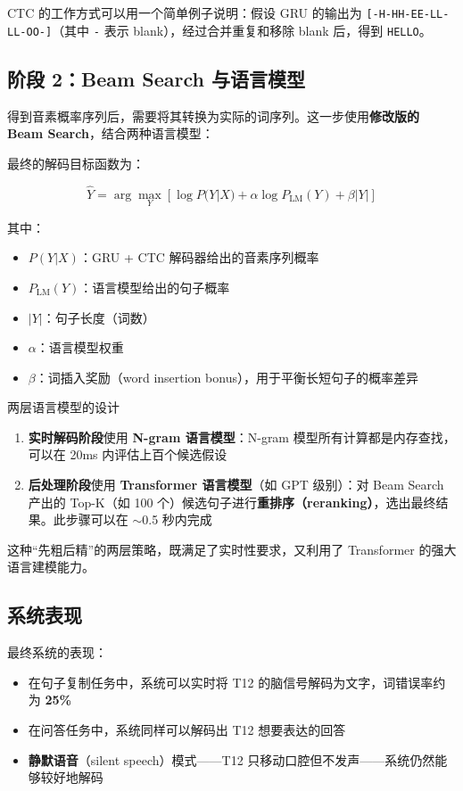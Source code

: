 \documentclass[a4paper]{article}
\begin{document}
CTC 的工作方式可以用一个简单例子说明：假设 GRU 的输出为 \texttt{[-H-HH-EE-LL-LL-OO-]}（其中 \texttt{-} 表示 blank），经过合并重复和移除 blank 后，得到 \texttt{HELLO}。

\subsection{阶段 2：Beam Search 与语言模型}

得到音素概率序列后，需要将其转换为实际的词序列。这一步使用\textbf{修改版的 Beam Search}，结合两种语言模型：

最终的解码目标函数为：

$$\hat{Y} = \arg\max_Y \left[ \log P(Y|X) + \alpha \log P_{\text{LM}}(Y) + \beta |Y| \right]$$

其中：
\begin{itemize}
    \item $P(Y|X)$：GRU + CTC 解码器给出的音素序列概率
    \item $P_{\text{LM}}(Y)$：语言模型给出的句子概率
    \item $|Y|$：句子长度（词数）
    \item $\alpha$：语言模型权重
    \item $\beta$：词插入奖励（word insertion bonus），用于平衡长短句子的概率差异
\end{itemize}

\begin{importantbox}{两层语言模型的设计}
\begin{enumerate}
    \item \textbf{实时解码阶段}使用 \textbf{N-gram 语言模型}：N-gram 模型所有计算都是内存查找，可以在 20ms 内评估上百个候选假设
    \item \textbf{后处理阶段}使用 \textbf{Transformer 语言模型}（如 GPT 级别）：对 Beam Search 产出的 Top-K（如 100 个）候选句子进行\textbf{重排序（reranking）}，选出最终结果。此步骤可以在 $\sim$0.5 秒内完成
\end{enumerate}

这种``先粗后精''的两层策略，既满足了实时性要求，又利用了 Transformer 的强大语言建模能力。
\end{importantbox}

\subsection{系统表现}

最终系统的表现：

\begin{itemize}
    \item 在句子复制任务中，系统可以实时将 T12 的脑信号解码为文字，词错误率约为 \textbf{25\%}
    \item 在问答任务中，系统同样可以解码出 T12 想要表达的回答
    \item \textbf{静默语音}（silent speech）模式——T12 只移动口腔但不发声——系统仍然能够较好地解码
\end{itemize}
\end{document}
